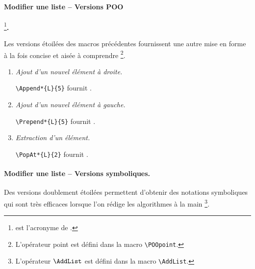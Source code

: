 \paragraph{Modifier une liste -- Versions POO}
\footnote{
	 est l'acronyme de .
}\textbf{.}\phantom{XX}\smallskip

Les versions étoilées des macros précédentes fournissent une autre mise en forme à la fois concise et aisée à comprendre
\footnote{
	L'opérateur point \POOpoint{} est défini dans la macro \texttt{\textbackslash{}POOpoint}.
}.

\begin{enumerate}
	\item \textit{Ajout d'un nouvel élément à droite.}

	      \verb++ fournit \Append*{L}{5}.


	\item \textit{Ajout d'un nouvel élément à gauche.}

	      \verb++ fournit \Prepend*{L}{5}.


	\item \textit{Extraction d'un élément.}

	      \verb++ fournit \PopAt*{L}{2}.
\end{enumerate}



\paragraph{Modifier une liste -- Versions symboliques.}\phantom{XX}\smallskip

Des versions doublement étoilées permettent d'obtenir des notations symboliques qui sont très efficaces lorsque l'on rédige les algorithmes à la main
\footnote{
	L'opérateur $\AddList$ est défini dans la macro \texttt{\textbackslash{}AddList}.
}.

